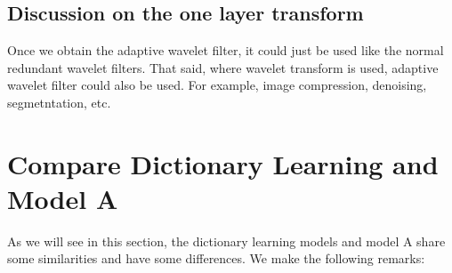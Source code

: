 \documentclass[a4paper]{article}
\begin{document}
\subsection{Discussion on the one layer transform}
Once we obtain the adaptive wavelet filter, it could just be used like the normal redundant wavelet filters. That said, where wavelet transform is used, adaptive wavelet filter could also be used. For example, image compression, denoising, segmetntation, etc.






























\newpage
\section{Compare Dictionary Learning and Model A}
As we will see in this section, the dictionary learning models and model A share some similarities and have some differences. We make the following remarks: 
\end{document}
